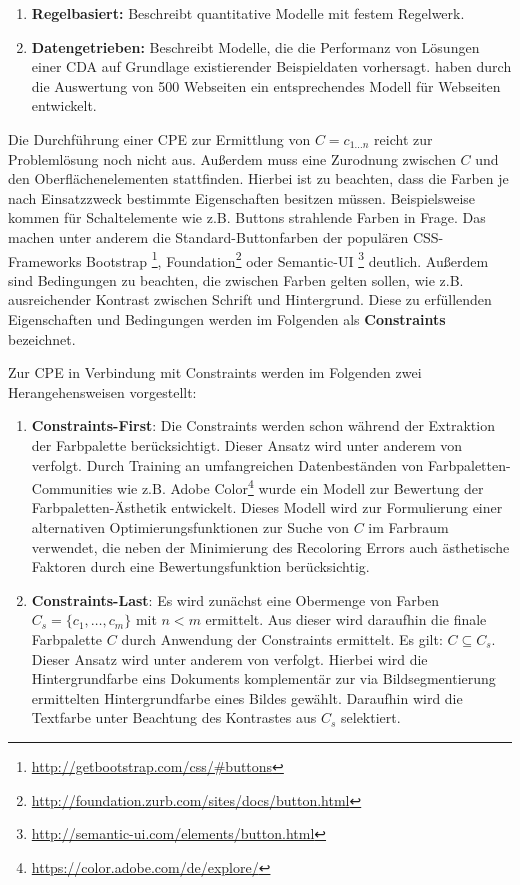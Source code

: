 \documentclass[10pt,a4paper,bibliography=totoc,twocolumn]{scrartcl}
\begin{document}
\begin{enumerate}
	\item \textbf{Regelbasiert:} Beschreibt quantitative Modelle mit festem Regelwerk.
	\item \textbf{Datengetrieben:} Beschreibt Modelle, die die Performanz von Lösungen einer CDA auf Grundlage existierender Beispieldaten vorhersagt. \citep{webpage} haben durch die Auswertung von 500 Webseiten ein entsprechendes Modell für Webseiten entwickelt.
\end{enumerate}

Die Durchführung einer CPE zur Ermittlung von $C = c_{1 \ldots n}$ reicht zur Problemlösung noch nicht aus. Außerdem muss eine Zurodnung zwischen $C$ und den Oberflächenelementen stattfinden. Hierbei ist zu beachten, dass die Farben je nach Einsatzzweck bestimmte Eigenschaften besitzen müssen. Beispielsweise kommen für Schaltelemente wie z.B. Buttons strahlende Farben in Frage. Das machen unter anderem die Standard-Buttonfarben der populären CSS-Frameworks Bootstrap \footnote{\url{http://getbootstrap.com/css/\#buttons}}, Foundation\footnote{\url{http://foundation.zurb.com/sites/docs/button.html}} oder Semantic-UI \footnote{\url{http://semantic-ui.com/elements/button.html}} deutlich. Außerdem sind Bedingungen zu beachten, die zwischen Farben gelten sollen, wie z.B. ausreichender Kontrast zwischen Schrift und Hintergrund. Diese zu erfüllenden Eigenschaften und Bedingungen werden im Folgenden als \textbf{Constraints} bezeichnet.

Zur CPE in Verbindung mit Constraints werden im Folgenden zwei Herangehensweisen vorgestellt:
\begin{enumerate}
    \item \textbf{Constraints-First}: Die Constraints werden schon während der Extraktion der Farbpalette berücksichtigt. Dieser Ansatz wird unter anderem von \citet{colorcomp} verfolgt. Durch Training an umfangreichen Datenbeständen von Farbpaletten-Communities wie z.B. Adobe Color\footnote{\url{https://color.adobe.com/de/explore/}} wurde ein Modell zur Bewertung der Farbpaletten-Ästhetik entwickelt. Dieses Modell wird zur Formulierung einer alternativen Optimierungsfunktionen zur Suche von $C$ im Farbraum verwendet, die neben der Minimierung des Recoloring Errors auch ästhetische Faktoren durch eine Bewertungsfunktion berücksichtig.
    \item \textbf{Constraints-Last}: Es wird zunächst eine Obermenge von Farben $C_s = \{c_1, \ldots , c_m\}$ mit $n < m$ ermittelt. Aus dieser wird daraufhin die finale Farbpalette $C$ durch Anwendung der Constraints ermittelt. Es gilt: $C \subseteq C_s$. Dieser Ansatz wird unter anderem von \citet{documentpalette} verfolgt. Hierbei wird die Hintergrundfarbe eins Dokuments komplementär zur via Bildsegmentierung ermittelten Hintergrundfarbe eines Bildes gewählt. Daraufhin wird die Textfarbe unter Beachtung des Kontrastes aus $C_s$ selektiert.
\end{enumerate}
\end{document}
